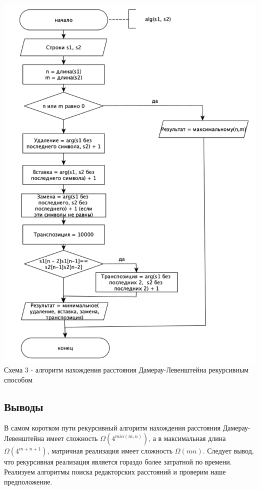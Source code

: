 \documentclass[a4paper,14pt]{article} %
\begin{document}
	\begin{center}
        		\includegraphics[scale = 0.5]{shema3} \\ Схема  3 - алгоритм нахождения расстояния Дамерау-Левенштейна рекурсивным способом
	\end{center}	
	
	\subsection{Выводы}
	\hfill
	
	В самом коротком пути рекурсивный алгоритм нахождения расстояния Дамерау-Левенштейна имеет сложность $\Omega(4^{min(m,n)})$, а в максимальная длина $\Omega(4^{m + n + 1})$, матричная реализация имеет сложность $\Omega(mn)$. Следует вывод, что рекурсивная реализация является гораздо более затратной по времени. Реализуем алгоритмы поиска редакторских расстояний и проверим наше предположение. 
\end{document}
